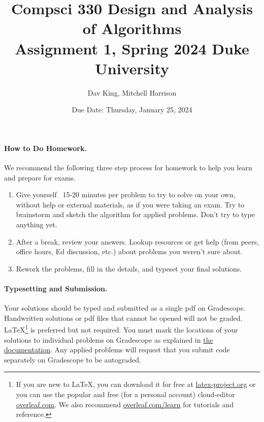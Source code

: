 \documentclass[11pt]{article}
\title{\vspace{-0.5in}Compsci 330 Design and Analysis of Algorithms \\
Assignment 1, Spring 2024 Duke University}
\author{Dav King, Mitchell Harrison}
\date{Due Date: Thursday, January 25, 2024}
\begin{document}
\maketitle



\paragraph{How to Do Homework.} We recommend the following three step process 
for homework to help you learn and prepare for exams.
\begin{enumerate}
	\item Give yourself ~15-20 minutes per problem to try to solve on your 
            own, without help or external materials, as if you were taking an 
            exam. Try to brainstorm and sketch the algorithm for applied 
            problems. Don't try to type anything yet.
	\item After a break, review your answers. Lookup resources or get help 
            (from peers, office hours, Ed discussion, etc.) about problems you 
            weren't sure about.
	\item Rework the problems, fill in the details, and typeset your final 
            solutions.
\end{enumerate}

\paragraph{Typesetting and Submission.} Your solutions should be typed and 
submitted as a single pdf on Gradescope. Handwritten solutions or pdf files 
that cannot be opened will not be graded. \LaTeX \footnote{If you are new to
\LaTeX, you can download it for free at 
\href{https://www.latex-project.org}{latex-project.org} or you can use the 
popular and free (for a personal account) cloud-editor 
\href{https://www.overleaf.com}{overleaf.com}. We also recommend 
\href{https://www.overleaf.com/learn}{overleaf.com/learn} for tutorials and 
reference.} is preferred but not required. %
You must mark the locations of your solutions to individual problems on 
Gradescope as explained in 
\href{https://help.gradescope.com/article/ccbpppziu9-student-submit-work#submitting_a_pdf}{the documentation}.
Any applied problems will request that you submit code separately on Gradescope
to be autograded. 
\end{document}
